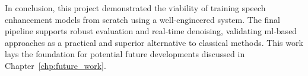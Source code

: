 In conclusion, this project demonstrated the viability of training speech enhancement models from scratch using a well-engineered system. The final pipeline supports robust evaluation and real-time denoising, validating \gls{ml}-based approaches as a practical and superior alternative to classical methods. This work lays the foundation for potential future developments discussed in Chapter~\ref{chp:future_work}.
